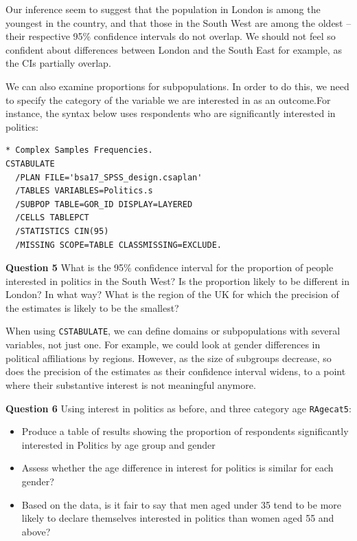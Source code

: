 \documentclass[
  14,
  a4paper,
  DIV=11,
  numbers=noendperiod]{scrartcl}
\begin{document}
Our inference seem to suggest that the population in London is among the
youngest in the country, and that those in the South West are among the
oldest -- their respective 95\% confidence intervals do not overlap. We
should not feel so confident about differences between London and the
South East for example, as the CIs partially overlap.

We can also examine proportions for subpopulations. In order to do this,
we need to specify the category of the variable we are interested in as
an outcome.For instance, the syntax below uses respondents who are
significantly interested in politics:

\begin{verbatim}
* Complex Samples Frequencies.
CSTABULATE
  /PLAN FILE='bsa17_SPSS_design.csaplan'
  /TABLES VARIABLES=Politics.s
  /SUBPOP TABLE=GOR_ID DISPLAY=LAYERED
  /CELLS TABLEPCT
  /STATISTICS CIN(95) 
  /MISSING SCOPE=TABLE CLASSMISSING=EXCLUDE.
\end{verbatim}

\textbf{Question 5} What is the 95\% confidence interval for the
proportion of people interested in politics in the South West? Is the
proportion likely to be different in London? In what way? What is the
region of the UK for which the precision of the estimates is likely to
be the smallest?

When using \texttt{CSTABULATE}, we can define domains or subpopulations
with several variables, not just one. For example, we could look at
gender differences in political affiliations by regions. However, as the
size of subgroups decrease, so does the precision of the estimates as
their confidence interval widens, to a point where their substantive
interest is not meaningful anymore.

\textbf{Question 6} Using interest in politics as before, and three
category age \texttt{RAgecat5}:

\begin{itemize}
\item
  Produce a table of results showing the proportion of respondents
  significantly interested in Politics by age group and gender
\item
  Assess whether the age difference in interest for politics is similar
  for each gender?
\item
  Based on the data, is it fair to say that men aged under 35 tend to be
  more likely to declare themselves interested in politics than women
  aged 55 and above?
\end{itemize}
\end{document}
